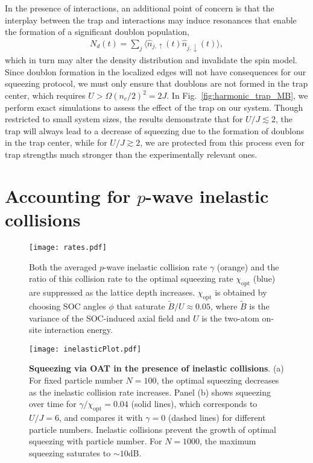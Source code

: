 \documentclass[aps,prx,superscriptaddress,notitlepage,twocolumn,longbibliography]{revtex4-1}
\begin{document}
In the presence of interactions, an additional point of concern is that the interplay between the trap and interactions may induce resonances that enable the formation of a significant doublon population,
\begin{align}
    N_d(t) = \sum_j \langle\hat{n}_{j,\uparrow}(t)\hat{n}_{j,
    \downarrow}(t) \rangle,
    \label{eq:doublon}
\end{align}
which in turn may alter the density distribution and invalidate the spin model. Since doublon formation in the localized edges will not have consequences for our squeezing protocol, we must only ensure that doublons are not formed in the trap center, which requires $U > \Omega (n_c/2)^2 = 2J$\cite{Pupillo2006}. In Fig.~\ref{fig:harmonic_trap_MB}, we perform exact simulations to assess the effect of the trap on our system. Though restricted to small system sizes, the results demonstrate that for $U/J \lesssim 2$, the trap will always lead to a decrease of squeezing due to the formation of doublons in the trap center, while for $U/J \gtrsim 2$, we are protected from this process even for trap strengths much stronger than the experimentally relevant ones.


\section{Accounting for $p$-wave inelastic collisions}
\label{App:inelastic_collision}
\setcounter{figure}{0}

\begin{figure}[t]
\centering
\texttt{[image: rates.pdf]}
\caption{
Both the averaged $p$-wave inelastic collision rate $\gamma$ (orange) and the ratio of this collision rate to the optimal squeezing rate $\chi_{\text{opt}}$ (blue) are suppressed as the lattice depth increases.
$\chi_{\text{opt}}$ is obtained by choosing SOC angles $\phi$ that saturate $\widetilde{B}/U\approx0.05$, where $\widetilde{B}$ is the variance of the SOC-induced axial field and $U$ is the two-atom on-site interaction energy.
}
\label{fig:inelastic_rates}
\end{figure}


\begin{figure*}[t]
\centering
\texttt{[image: inelasticPlot.pdf]}
\caption{\textbf{Squeezing via OAT in the presence of inelastic collisions}.
(a) For fixed particle number $N=100$, the optimal squeezing decreases as the inelastic collision rate increases.
Panel (b) shows squeezing over time for $\gamma/\chi_{\text{opt}}=0.04$ (solid lines), which corresponds to $U/J=6$,
and compares it with $\gamma=0$ (dashed lines) for  different particle numbers.
Inelastic collisions prevent the growth of optimal  squeezing with  particle number. For $N=1000$, the maximum squeezing saturates to $\sim 10$dB.
}
\label{fig:inelastic_squeezing}
\end{figure*}
\end{document}

